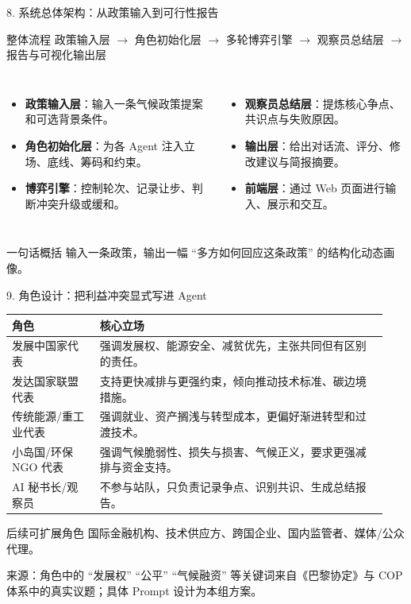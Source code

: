\documentclass[aspectratio=169,10.5pt]{ctexbeamer}
\newcommand{\source}[1]{\vfill{\tiny\color{textgray}来源：#1}}
\begin{document}
\begin{frame}{8. 系统总体架构：从政策输入到可行性报告}
  \begin{block}{整体流程}
    政策输入层 $\rightarrow$ 角色初始化层 $\rightarrow$ 多轮博弈引擎 $\rightarrow$ 观察员总结层 $\rightarrow$ 报告与可视化输出层
  \end{block}
  \begin{columns}[T]
    \begin{itemize}
      \item \textbf{政策输入层}：输入一条气候政策提案和可选背景条件。
      \item \textbf{角色初始化层}：为各 Agent 注入立场、底线、筹码和约束。
      \item \textbf{博弈引擎}：控制轮次、记录让步、判断冲突升级或缓和。
    \end{itemize}
    \begin{itemize}
      \item \textbf{观察员总结层}：提炼核心争点、共识点与失败原因。
      \item \textbf{输出层}：给出对话流、评分、修改建议与简报摘要。
      \item \textbf{前端层}：通过 Web 页面进行输入、展示和交互。
    \end{itemize}
  \end{columns}
  \begin{alertblock}{一句话概括}
    输入一条政策，输出一幅 ``多方如何回应这条政策'' 的结构化动态画像。
  \end{alertblock}
\end{frame}

\begin{frame}{9. 角色设计：把利益冲突显式写进 Agent}
  \begin{tabular}{p{0.22\linewidth} p{0.72\linewidth}}
    \toprule
    角色 & 核心立场\\
    \midrule
    发展中国家代表 & 强调发展权、能源安全、减贫优先，主张共同但有区别的责任。\\
    发达国家联盟代表 & 支持更快减排与更强约束，倾向推动技术标准、碳边境措施。\\
    传统能源/重工业代表 & 强调就业、资产搁浅与转型成本，更偏好渐进转型和过渡技术。\\
    小岛国/环保 NGO 代表 & 强调气候脆弱性、损失与损害、气候正义，要求更强减排与资金支持。\\
    AI 秘书长/观察员 & 不参与站队，只负责记录争点、识别共识、生成总结报告。\\
    \bottomrule
  \end{tabular}
  \begin{block}{后续可扩展角色}
    国际金融机构、技术供应方、跨国企业、国内监管者、媒体/公众代理。
  \end{block}
  \source{角色中的 ``发展权'' ``公平'' ``气候融资'' 等关键词来自《巴黎协定》与 COP 体系中的真实议题；具体 Prompt 设计为本组方案。}
\end{frame}
\end{document}
